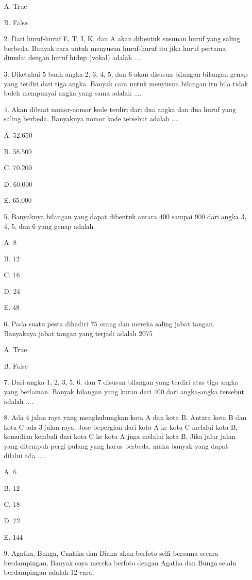 \documentclass[11pt,fleqn]{book} %
\begin{document}
A. 
True

B. 
False

2. 
Dari huruf-huruf E, T, I, K, dan A akan dibentuk susunan huruf yang saling berbeda. Banyak cara untuk menyusun huruf-huruf itu jika huruf pertama dimulai dengan huruf hidup (vokal) adalah ....

3. 
Diketahui 5 buah angka 2, 3, 4, 5, dan 6 akan disusun bilangan-bilangan genap yang terdiri dari tiga angka. Banyak cara untuk menyusun bilangan itu bila tidak boleh mempunyai angka yang sama adalah ....

4. 
Akan dibuat nomor-nomor kode terdiri dari dua angka dan dua huruf yang saling berbeda. Banyaknya nomor kode tersebut adalah ....

A. 
52.650

B. 
58.500

C. 
70.200

D. 
60.000

E. 
65.000

5. 
Banyaknya bilangan yang dapat dibentuk antara 400 sampai 900 dari angka 3, 4, 5, dan 6 yang genap adalah

A. 
8

B. 
12

C. 
16

D. 
24

E. 
48

6. 
Pada suatu pesta dihadiri 75 orang dan mereka saling jabat tangan. Banyaknya jabat tangan yang terjadi adalah 2075

A. 
True

B. 
False

7. 
Dari angka 1, 2, 3, 5. 6. dan 7 disusun bilangan yang terdiri atas tiga angka yang berlainan. Banyak bilangan yang kuran dari 400 dari angka-angka tersebut adalah ....

8. 
Ada 4 jalan raya yang menghubungkan kota A dan kota B. Antara kota B dan kota C ada 3 jalan raya. Jose bepergian dari kota A ke kota C melalui kota B, kemudian kembali dari kota C ke kota A juga melalui kota B. Jika jalur jalan yang ditempuh pergi pulang yang harus berbeda, maka banyak yang dapat dilalui ada ....

A. 
6

B. 
12

C. 
18

D. 
72

E. 
144

9. 
Agatha, Bunga, Cantika dan Diana akan berfoto selfi bersama secara berdampingan. Banyak caya mereka berfoto dengan Agatha dan Bunga selalu berdampingan adalah 12 cara.
\end{document}
